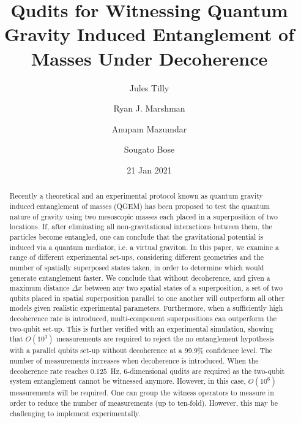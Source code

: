 \documentclass[%
 12pt,
 superscriptaddress,
 amsmath,
 amssymb,
 onecolumn,
 longbibliography
]{revtex4-2}
\date{21 Jan 2021}
\begin{document}

\title{Qudits for Witnessing Quantum Gravity Induced Entanglement of Masses Under Decoherence}%

\author{Jules Tilly}
\author{Ryan J. Marshman}
 
\author{Anupam Mazumdar}
\author{Sougato Bose}






\begin{abstract}
Recently a theoretical and an experimental protocol known as quantum gravity induced entanglement of masses (QGEM) has been proposed to test the quantum nature of gravity using two mesoscopic masses each placed in a superposition of two locations. If, after eliminating all non-gravitational interactions between them, the particles become entangled, one can conclude that the gravitational potential is induced via a quantum mediator, i.e. a virtual graviton. In this paper, we examine a range of different experimental set-ups, considering different geometries and the number of spatially superposed states taken, in order to determine which would generate entanglement faster. We conclude that without decoherence, and given a maximum distance $\Delta x$ between any two spatial states of a superposition, a set of two qubits placed in spatial superposition parallel to one another will outperform all other models given realistic experimental parameters. Furthermore, when a sufficiently high decoherence rate is introduced, multi-component superpositions can outperform the two-qubit set-up. This is further verified with an experimental simulation, showing that $O(10^3)$ measurements are required to reject the no entanglement hypothesis with a parallel qubits set-up without decoherence at a 99.9$\%$ confidence level. The number of measurements increases when decoherence is introduced. When the decoherence rate reaches $0.125$~Hz, 6-dimensional qudits are required as the two-qubit system entanglement cannot be witnessed anymore. However, in this case, $O(10^6)$ measurements will be required. One can group the witness operators to measure in order to reduce the number of measurements (up to ten-fold). However, this may be challenging to implement experimentally.   

\end{abstract}
\end{document}
